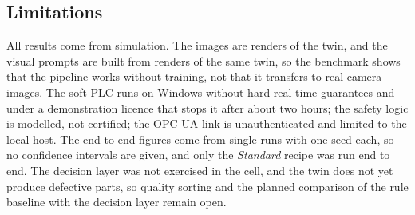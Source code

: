 \subsection{Limitations}

All results come from simulation. The images are renders of the twin, and the visual prompts are
built from renders of the same twin, so the benchmark shows that the pipeline works without
training, not that it transfers to real camera images. The soft-PLC runs on Windows without
hard real-time guarantees and under a demonstration licence that stops it after about two hours;
the safety logic is modelled, not certified; the OPC UA link is unauthenticated and limited to
the local host. The end-to-end figures come from single runs with one seed each, so no
confidence intervals are given, and only the \emph{Standard} recipe was run end to end. The
decision layer was not exercised in the cell, and the twin does not yet produce defective parts,
so quality sorting and the planned comparison of the rule baseline with the decision layer
remain open.
